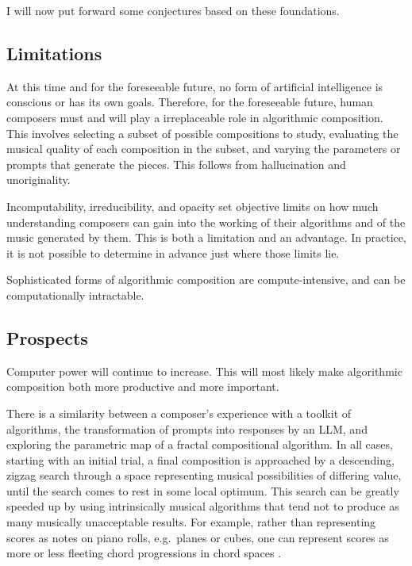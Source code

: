 \documentclass[11pt]{scrartcl}
\begin{document}
I will now put forward some conjectures based on these foundations.

\subsection*{Limitations}

At this time and for the foreseeable future, no form of artificial intelligence is conscious or has its own goals. Therefore, for the foreseeable future, human composers must and will play a irreplaceable role in algorithmic composition. This involves selecting a subset of possible compositions to study, evaluating the musical quality of each composition in the subset, and varying the parameters or prompts that generate the pieces. This follows from hallucination and unoriginality.

Incomputability, irreducibility, and opacity set objective limits on how much understanding composers can gain into the working of their algorithms and of the music generated by them. This is both a limitation and an advantage. In practice, it is not possible to determine in advance just where those limits lie.

Sophisticated forms of algorithmic composition are compute-intensive, and can be computationally intractable.

\subsection*{Prospects}

Computer power will continue to increase. This will most likely make algorithmic composition both more productive and more important.

There is a similarity between a composer's experience with a toolkit of algorithms, the transformation of prompts into responses by an LLM, and exploring the parametric map of a fractal compositional algorithm. In all cases, starting with an initial trial, a final composition is approached by a descending, zigzag search through a space representing musical possibilities of differing value, until the search comes to rest in some local optimum. This search can be greatly speeded up by using intrinsically musical algorithms that tend not to produce as many musically unacceptable results. For example, rather than representing scores as notes on piano rolls, e.g.\ planes or cubes, one can represent scores as more or less fleeting chord progressions in chord spaces \parencite{gogins2006score, gogins2023scoregraphs}.
\end{document}
